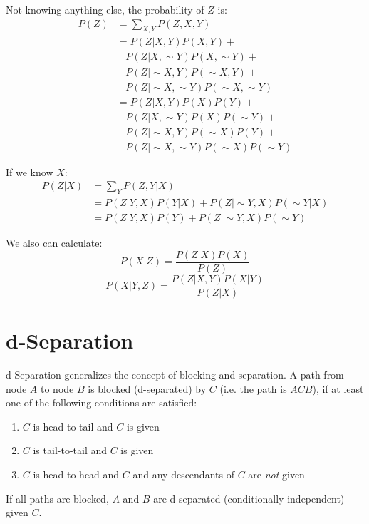 \begin{multicols}{2}
\noindent Not knowing anything else, the probability of $Z$ is:
\begin{equation*}
\begin{split}
    P(Z) &= \sum_{X,Y} P(Z,X,Y) \\
    &= P(Z|X,Y) P(X,Y) + \\
    &\ \ \ \ P(Z|X,\sim Y) P(X,\sim Y) + \\
    &\ \ \ \ P(Z|\sim X,Y) P(\sim X,Y) + \\
    &\ \ \ \ P(Z|\sim X,\sim Y) P(\sim X,\sim Y) \\
    &= P(Z|X,Y) P(X) P(Y) + \\
    &\ \ \ \ P(Z|X,\sim Y) P(X) P(\sim Y) + \\
    &\ \ \ \ P(Z|\sim X,Y) P(\sim X) P(Y) + \\
    &\ \ \ \ P(Z|\sim X,\sim Y) P(\sim X) P(\sim Y)
\end{split}
\end{equation*}
 
\noindent If we know $X$:
\begin{equation*}
\begin{split}
    P(Z|X) &= \sum_Y P(Z,Y|X)\\
    &= P(Z|Y,X) P(Y|X) + P(Z|\sim Y,X) P(\sim Y|X) \\
    &= P(Z|Y,X) P(Y) + P(Z|\sim Y,X) P(\sim Y) 
\end{split}
\end{equation*}

\noindent We also can calculate:
$$P(X|Z) = \frac{P(Z|X)P(X)}{P(Z)}$$
$$P(X|Y,Z) = \frac{P(Z|X,Y) P(X|Y)}{P(Z|X)}$$

\section{d-Separation}

\noindent d-Separation generalizes the concept of blocking and separation. A path from node $A$ to node $B$ is blocked (d-separated) by $C$ (i.e. the path is $ACB$), if at least one of the following conditions are satisfied:

\begin{enumerate}
    \item $C$ is head-to-tail and $C$ is given
    \item $C$ is tail-to-tail and $C$ is given
    \item $C$ is head-to-head and $C$ and any descendants of $C$ are \textit{not} given
\end{enumerate}

\noindent If all paths are blocked, $A$ and $B$ are d-separated (conditionally independent) given $C$. 

\end{multicols}
